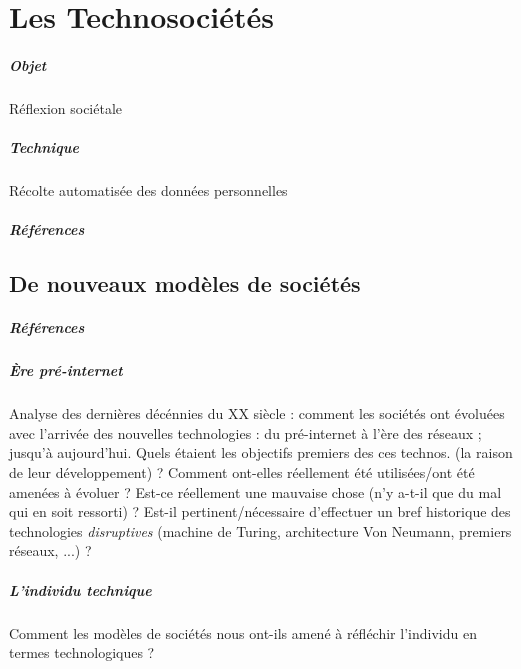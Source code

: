 \chapter{Les Technosociétés}
\paragraph{Objet} Réflexion sociétale
\paragraph{Technique} Récolte automatisée des données personnelles
\paragraph{Références}
\cite{Damasio0}
\cite{Damasio1}
\cite{Damasio2}
\cite{Deleuze0}
\cite{Foucault0}
\cite{Huxley0}
\cite{Klein0}
\cite{Marx0}
\cite{Marx1}
\cite{Moore0}
\cite{Negri0}
\cite{Nietzsche0}
\cite{Orwell0}
\cite{Pieces0}
\cite{Rabhi0}
\cite{Rabhi1}
\cite{Rufin0}
\cite{Arte0}
\cite{GhostInTheShell}
\cite{Gunnm}
\cite{PsychoPass}

\section{De nouveaux modèles de sociétés}
\paragraph{Références} \cite{Marx0} \cite{Marx1} \cite{Nietzsche0}

\paragraph{Ère pré-internet} Analyse des dernières décénnies du XX siècle :
comment les sociétés ont évoluées avec l'arrivée des nouvelles technologies : du
pré-internet à l'ère des réseaux ; jusqu'à aujourd'hui. Quels étaient les objectifs
premiers des ces technos. (la raison de leur développement) ? Comment ont-elles réellement
été utilisées/ont été amenées à évoluer ? Est-ce réellement une mauvaise chose (n'y
a-t-il que du mal qui en soit ressorti) ? Est-il pertinent/nécessaire d'effectuer un bref
historique des technologies \emph{disruptives} (machine de Turing, architecture
Von Neumann, premiers réseaux, ...) ?

\paragraph{L'individu technique} Comment les modèles de sociétés nous ont-ils amené à
réfléchir l'individu en termes technologiques ?

